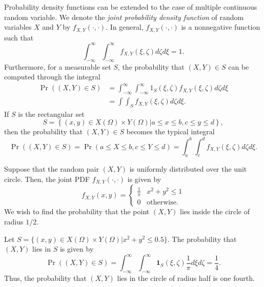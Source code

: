 Probability density functions can be extended to the case of multiple continuous random variable.
We denote the \emph{joint probability density function} of random variables $X$ and $Y$ by $f_{X,Y} (\cdot, \cdot)$. 
In general, $f_{X,Y} (\cdot, \cdot)$ is a nonnegative function such that
\begin{equation*}
\int_{-\infty}^{\infty} \int_{-\infty}^{\infty}
f_{X, Y} (\xi, \zeta) d\zeta d\xi = 1.
\end{equation*}
Furthermore, for a measurable set $S$, the probability that $(X,Y) \in S$ can be computed through the integral
\begin{equation*}
\begin{split}
\Pr ((X,Y) \in S)
&= \int_{-\infty}^{\infty} \int_{-\infty}^{\infty}
\mathrm{1}_{S}(\xi, \zeta) f_{X, Y} (\xi, \zeta) d\zeta d\xi \\
&= \int \int_{S}
f_{X, Y} (\xi, \zeta) d\zeta d\xi .
\end{split}
\end{equation*}
If $S$ is the rectangular set
\begin{equation*}
S = \left\{ (x,y) \in X(\Omega) \times Y(\Omega) \big| a \leq x \leq b, c \leq y \leq d \right\} ,
\end{equation*}
then the probability that $(X,Y) \in S$ becomes the typical integral
\begin{equation*}
\Pr ((X,Y) \in S)
= \Pr (a \leq X \leq b, c \leq Y \leq d)
= \int_{a}^{b} \int_{c}^{d}
f_{X, Y} (\xi, \zeta) d\zeta d\xi .
\end{equation*}

\begin{example}
Suppose that the random pair $(X, Y)$ is uniformly distributed over the unit circle.
Then, the joint PDF $f_{X,Y} (\cdot, \cdot)$ is given by
\begin{equation*}
f_{X,Y} (x, y) = \begin{cases} \frac{1}{\pi} & x^2 + y^2 \leq 1 \\
0 & \text{otherwise} . \end{cases}
\end{equation*}
We wish to find the probability that the point $(X, Y)$ lies inside the circle of radius $1/2$.

Let $S = \{ (x, y) \in X(\Omega) \times Y(\Omega) | x^2 + y^2 \leq 0.5 \}$.
The probability that $(X, Y)$ lies in $S$ is given by
\begin{equation*}
\Pr ((X,Y) \in S)
= \int_{-\infty}^{\infty} \int_{-\infty}^{\infty}
\mathbf{1}_{S}(\xi, \zeta) \frac{1}{\pi} d\xi d\zeta
= \frac{1}{4} .
\end{equation*}
Thus, the probability that $(X,Y)$ lies in the circle of radius half is one fourth.
\end{example}

